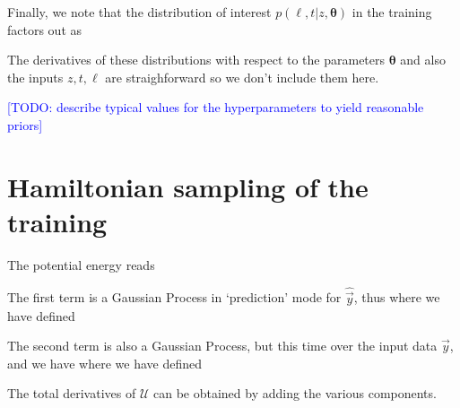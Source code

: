 \documentclass[aps,prd,showpacs,superscriptaddress,groupedaddress]{revtex4}  %
\newcommand{\todo}[1]{\textcolor{blue}{[TODO: #1]}}
\begin{document}
Finally, we note that the distribution of interest $p(\ell,t|z,\bm{\theta})$ in the training factors out as
 
The derivatives of these distributions with respect to the parameters $\bm{\theta}$ and also the inputs $z,t,\ell$ are straighforward so we don't include them here.

\todo{describe typical values for the hyperparameters to yield reasonable priors}



\section{Hamiltonian sampling of the training}

The potential energy reads
	
The first term is a Gaussian Process in `prediction' mode for $\hat{\vec{y}}$, thus
where we have defined

The second term is also a Gaussian Process, but this time over the input data $\vec{y}$, and we have
where we have defined



The total derivatives of $\mathcal{U}$ can be obtained by adding the various components.
\end{document}
